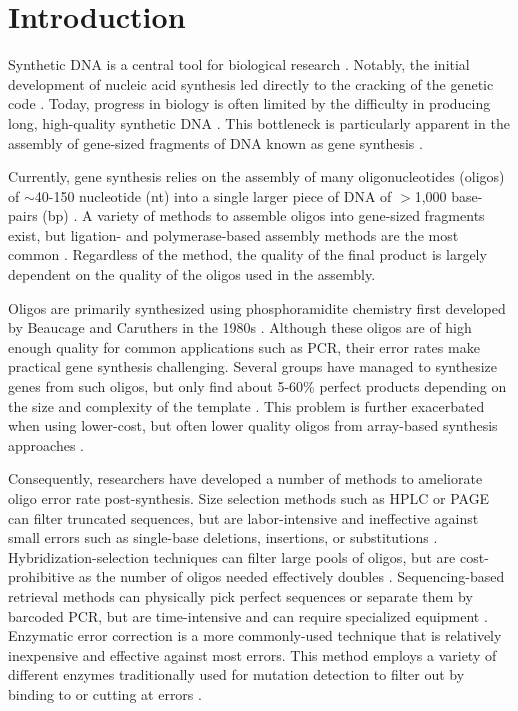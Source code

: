\documentclass[letterpaper,12pt]{article}
\begin{document}
%
\section*{Introduction}
%

\doublespacing
Synthetic DNA is a central tool for biological research \cite{hughes2017}. Notably, the initial development of nucleic acid synthesis led directly to the cracking of the genetic code \cite{nirenberg1964}. Today, progress in biology is often limited by the difficulty in producing long, high-quality synthetic DNA \cite{kosuri2014,boeke2016}. This bottleneck is particularly apparent in the assembly of gene-sized fragments of DNA known as gene synthesis \cite{ma2012dna2}.

Currently, gene synthesis relies on the assembly of many oligonucleotides (oligos) of $\sim$40-150 nucleotide (nt) into a single larger piece of DNA of $>$1,000 base-pairs (bp) \cite{ma2012dna2}. A variety of methods to assemble oligos into gene-sized fragments exist, but ligation- and polymerase-based assembly methods are the most common \cite{au1998,zhou2004,bang2008,gibson2009}. Regardless of the method, the quality of the final product is largely dependent on the quality of the oligos used in the assembly.

Oligos are primarily synthesized using phosphoramidite chemistry first developed by Beaucage and Caruthers in the 1980s \cite{beaucage1981}. Although these oligos are of high enough quality for common applications such as PCR, their error rates make practical gene synthesis challenging. Several groups have managed to synthesize genes from such oligos, but only find about 5-60\% perfect products depending on the size and complexity of the template \cite{carr2004,fuhrmann2005,currin2014,sequeira2016}. This problem is further exacerbated when using lower-cost, but often lower quality oligos from array-based synthesis approaches \cite{kosuri2010,tian2004,quan2011,kim2012,saaem2012,wan2014}.

Consequently, researchers have developed a number of methods to ameliorate oligo error rate post-synthesis. Size selection methods such as HPLC or PAGE can filter truncated sequences, but are labor-intensive and ineffective against small errors such as single-base deletions, insertions, or substitutions \cite{ellington2001,sinha2015}. Hybridization-selection techniques can filter large pools of oligos, but are cost-prohibitive as the number of oligos needed effectively doubles \cite{tian2004,borovkov2010}. Sequencing-based retrieval methods can physically pick perfect sequences or separate them by barcoded PCR, but are time-intensive and can require specialized equipment \cite{matzas2010,schwartz2012,lee2015}. Enzymatic error correction is a more commonly-used technique that is relatively inexpensive and effective against most errors. This method employs a variety of different enzymes traditionally used for mutation detection to filter out by binding to or cutting at errors \cite{mashal1995,youil1995,wagner1995,qiu2004mutation}.
\end{document}
